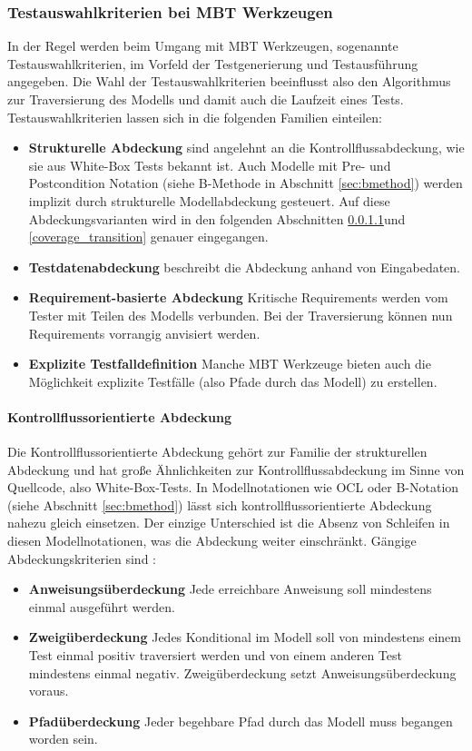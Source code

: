\subsubsection{Testauswahlkriterien bei \Gls{MBT} Werkzeugen}
In der Regel werden beim Umgang mit \Gls{MBT} Werkzeugen, sogenannte Testauswahlkriterien, im Vorfeld der Testgenerierung und Testausführung angegeben. Die Wahl der Testauswahlkriterien beeinflusst also den Algorithmus zur Traversierung des Modells und damit auch die Laufzeit eines Tests.\\
Testauswahlkriterien lassen sich in die folgenden Familien einteilen:

\begin{itemize}
\item \textbf{Strukturelle Abdeckung} sind angelehnt an die Kontrollflussabdeckung, wie sie aus White-Box Tests bekannt ist. Auch Modelle mit Pre- und Postcondition Notation (siehe B-Methode in Abschnitt \ref{sec:bmethod}) werden implizit durch strukturelle Modellabdeckung gesteuert. Auf diese Abdeckungsvarianten wird in den folgenden Abschnitten \ref{coverage_control}und \ref{coverage_transition} genauer eingegangen.
\item \textbf{Testdatenabdeckung} beschreibt die Abdeckung anhand von Eingabedaten.
\item \textbf{Requirement-basierte Abdeckung} Kritische Requirements werden vom Tester mit Teilen des Modells verbunden. Bei der Traversierung können nun Requirements vorrangig anvisiert werden.
\item \textbf{Explizite Testfalldefinition} Manche \Gls{MBT} Werkzeuge bieten auch die Möglichkeit explizite Testfälle (also Pfade durch das Modell) zu erstellen.
\end{itemize}

\paragraph{Kontrollflussorientierte Abdeckung}\label{coverage_control} Die Kontrollflussorientierte Abdeckung gehört zur Familie der strukturellen Abdeckung und hat große Ähnlichkeiten zur Kontrollflussabdeckung im Sinne von Quellcode, also White-Box-Tests. In Modellnotationen wie OCL \cite{warmer_object_2004} oder B-Notation (siehe Abschnitt \ref{sec:bmethod}) lässt sich kontrollflussorientierte Abdeckung nahezu gleich einsetzen. Der einzige Unterschied ist die Absenz von Schleifen in diesen Modellnotationen, was die Abdeckung weiter einschränkt. Gängige Abdeckungskriterien sind \cite{rossner_basiswissen_2010}:
\begin{itemize}
\item \textbf{Anweisungsüberdeckung} Jede erreichbare Anweisung soll mindestens einmal ausgeführt werden.
\item \textbf{Zweigüberdeckung} Jedes Konditional im Modell soll von mindestens einem Test einmal positiv traversiert werden und von einem anderen Test mindestens einmal negativ. Zweigüberdeckung setzt Anweisungsüberdeckung voraus.
\item \textbf{Pfadüberdeckung} Jeder begehbare Pfad durch das Modell muss begangen worden sein.
\end{itemize}

